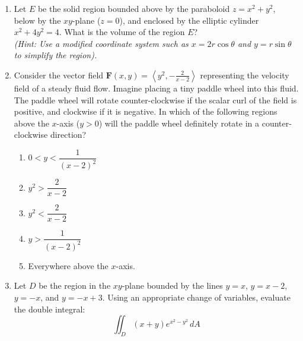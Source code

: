 \documentclass[a4paper, 12pt]{article}
\begin{document}
\begin{enumerate}[leftmargin=*,label=\textbf{\arabic*.}]
\begin{enumerate}[leftmargin=*, label=\textbf{\arabic{enumi}.\arabic*.}]
\item Let $E$ be the solid region bounded above by the paraboloid $z = x^2 + y^2$, below by the $xy$-plane ($z = 0$), and enclosed by the elliptic cylinder $x^2 + 4y^2 = 4$. What is the volume of the region $E$? \\
\textit{(Hint: Use a modified coordinate system such as $x = 2r \cos\theta$ and $y = r \sin\theta$ to simplify the region).}


\newpage
\item Consider the vector field $\mathbf{F}(x, y) = \left\langle y^2, -\frac{2}{x-2} \right\rangle$ representing the velocity field of a steady fluid flow. Imagine placing a tiny paddle wheel into this fluid. The paddle wheel will rotate counter-clockwise if the scalar curl of the field is positive, and clockwise if it is negative. In which of the following regions above the $x$-axis ($y > 0$) will the paddle wheel definitely rotate in a counter-clockwise direction?

\begin{enumerate}
    \item[(A)] $0 < y < \dfrac{1}{(x-2)^2}$
    \item[(B)] $y^2 > \dfrac{2}{x-2}$
    \item[(C)] $y^2 < \dfrac{2}{x-2}$
    \item[(D)] $y > \dfrac{1}{(x-2)^2}$
    \item[(E)] Everywhere above the $x$-axis.
\end{enumerate}

\item Let $D$ be the region in the $xy$-plane bounded by the lines $y = x$, $y = x - 2$, $y = -x$, and $y = -x + 3$. Using an appropriate change of variables, evaluate the double integral:
\[\iint_D (x + y) e^{x^2 - y^2}\,dA\]



\end{enumerate}
\end{enumerate}
\end{document}
